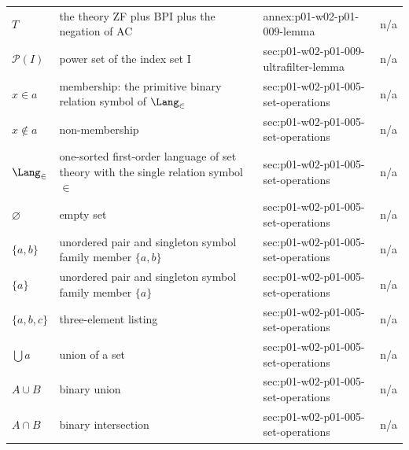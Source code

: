 \begin{longtable}{@{}p{}p{}p{}p{}@{}}
\(T\) & the theory ZF plus BPI plus the negation of AC & annex:\allowbreak{}p01-\allowbreak{}w02-\allowbreak{}p01-\allowbreak{}009-\allowbreak{}lemma & n/a \\
\(\mathcal P(I)\) & power set of the index set I & sec:\allowbreak{}p01-\allowbreak{}w02-\allowbreak{}p01-\allowbreak{}009-\allowbreak{}ultrafilter-\allowbreak{}lemma & n/a \\
\(x\in a\) & membership: the primitive binary relation symbol of \(\Lang_{\in}\) & sec:\allowbreak{}p01-\allowbreak{}w02-\allowbreak{}p01-\allowbreak{}005-\allowbreak{}set-\allowbreak{}operations & n/a \\
\(x\notin a\) & non-membership & sec:\allowbreak{}p01-\allowbreak{}w02-\allowbreak{}p01-\allowbreak{}005-\allowbreak{}set-\allowbreak{}operations & n/a \\
\(\Lang_{\in}\) & one-sorted first-order language of set theory with the single relation symbol \(\in\) & sec:\allowbreak{}p01-\allowbreak{}w02-\allowbreak{}p01-\allowbreak{}005-\allowbreak{}set-\allowbreak{}operations & n/a \\
\(\varnothing\) & empty set & sec:\allowbreak{}p01-\allowbreak{}w02-\allowbreak{}p01-\allowbreak{}005-\allowbreak{}set-\allowbreak{}operations & n/a \\
\(\{a,\allowbreak b\}\) & unordered pair and singleton symbol family member \(\{a,b\}\) & sec:\allowbreak{}p01-\allowbreak{}w02-\allowbreak{}p01-\allowbreak{}005-\allowbreak{}set-\allowbreak{}operations & n/a \\
\(\{a\}\) & unordered pair and singleton symbol family member \(\{a\}\) & sec:\allowbreak{}p01-\allowbreak{}w02-\allowbreak{}p01-\allowbreak{}005-\allowbreak{}set-\allowbreak{}operations & n/a \\
\(\{a,\allowbreak b,\allowbreak c\}\) & three-element listing & sec:\allowbreak{}p01-\allowbreak{}w02-\allowbreak{}p01-\allowbreak{}005-\allowbreak{}set-\allowbreak{}operations & n/a \\
\(\bigcup a\) & union of a set & sec:\allowbreak{}p01-\allowbreak{}w02-\allowbreak{}p01-\allowbreak{}005-\allowbreak{}set-\allowbreak{}operations & n/a \\
\(A\cup B\) & binary union & sec:\allowbreak{}p01-\allowbreak{}w02-\allowbreak{}p01-\allowbreak{}005-\allowbreak{}set-\allowbreak{}operations & n/a \\
\(A\cap B\) & binary intersection & sec:\allowbreak{}p01-\allowbreak{}w02-\allowbreak{}p01-\allowbreak{}005-\allowbreak{}set-\allowbreak{}operations & n/a \\

\end{longtable}

